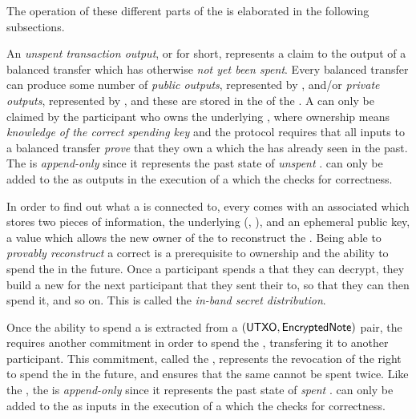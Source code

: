 The operation of these different parts of the \ShieldedAssetPool{} is elaborated in the following subsections.


An \emph{unspent transaction output}, or \UTXO{} for short, represents a claim to the output of a balanced transfer which has otherwise \emph{not yet been spent}. Every balanced transfer can produce some number of \emph{public outputs}, represented by , and/or \emph{private outputs}, represented by , and these  are stored in the \UTXOSet{} of the \ShieldedAssetPool{}. A \UTXO{} can only be claimed by the participant who owns the underlying \PrivateAsset{}, where ownership means \emph{knowledge of the correct spending key} and the \Transfer{} protocol requires that all inputs to a balanced transfer \emph{prove} that they own a \UTXO{} which the \ShieldedAssetPool{} has already seen in the past. The \UTXOSet{} is \emph{append-only} since it represents the past state of \emph{unspent} .  can only be added to the \UTXOSet{} as outputs in the execution of a \Transfer{} which the \Ledger{} checks for correctness.


In order to find out what \PrivateAsset{} a \UTXO{} is connected to, every \UTXO{} comes with an associated \EncryptedNote{} which stores two pieces of information, the underlying (\AssetId{}, \AssetValue{}), and an ephemeral public key, a value which allows the new owner of the \PrivateAsset{} to reconstruct the \UTXO{}. Being able to \emph{provably reconstruct} a correct \UTXO{} is a prerequisite to ownership and the ability to spend the \PrivateAsset{} in the future. Once a participant spends a \PrivateAsset{} that they can decrypt, they build a new \EncryptedNote{} for the next participant that they sent their  to, so that they can then spend it, and so on. This is called the \emph{in-band secret distribution}.


Once the ability to spend a \PrivateAsset{} is extracted from a $({\textsf{UTXO}}, {\textsf{EncryptedNote}})$ pair, the \ShieldedAssetPool{} requires another commitment in order to spend the \PrivateAsset{}, transfering it to another participant. This commitment, called the \VoidNumber{}, represents the revocation of the right to spend the \PrivateAsset{} in the future, and ensures that the same \PrivateAsset{} cannot be spent twice. Like the \UTXOSet{}, the \VoidNumberSet{} is \emph{append-only} since it represents the past state of \emph{spent} .  can only be added to the \VoidNumberSet{} as inputs in the execution of a \Transfer{} which the \Ledger{} checks for correctness.
